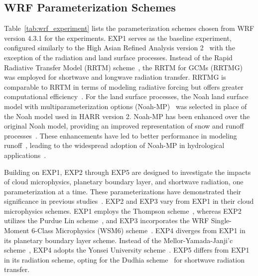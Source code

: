 \documentclass[draft]{agujournal2019}
\begin{document}
\subsection{WRF Parameterization Schemes}
\label{sec:wrf}

Table~\ref{tab:wrf_experiment} lists the parameterization schemes chosen from WRF version 4.3.1 for the experiments. EXP1 serves as the baseline experiment, configured similarly to the High Asian Refined Analysis version 2~\cite{wang2021IJC} with the exception of the radiation and land surface processes. Instead of the Rapid Radiative Transfer Model (RRTM) scheme~\cite{mlawer1997JGRA}, the RRTM for GCMs (RRTMG)~\cite{iacono2008JGRA} was employed for shortwave and longwave radiation transfer. RRTMG is comparable to RRTM in terms of modeling radiative forcing but offers greater computational efficiency~\cite{iacono2008JGRA}. For the land surface processes, the Noah land surface model with multiparameterization options (Noah-MP)~\cite{niu2011JGRA,yang2011JGRA} was selected in place of the Noah model used in HARR version 2. Noah-MP has been enhanced over the original Noah model, providing an improved representation of snow and runoff processes~\cite{niu2011JGRA}. These enhancements have led to better performance in modeling runoff~\cite{liang2019AAS, zheng2023ESSD}, leading to the widespread adoption of Noah-MP in hydrological applications~\cite{cosgrove2024JAWRA, lin2018JHM}.

Building on EXP1, EXP2 through EXP5 are designed to investigate the impacts of cloud microphysics, planetary boundary layer, and shortwave radiation, one parameterization at a time. These parameterizations have demonstrated their significance in previous studies~\cite{lv2020JGRA, prein2023CD}. EXP2 and EXP3 vary from EXP1 in their cloud microphysics schemes. EXP1 employs the Thompson scheme~\cite{thompson2008MWR}, whereas EXP2 utilizes the Purdue Lin scheme~\cite{chen2002JMSJ}, and EXP3 incorporates the WRF Single-Moment 6-Class Microphysics (WSM6) scheme~\cite{hong2006APJAS}. EXP4 diverges from EXP1 in its planetary boundary layer scheme. Instead of the Mellor-Yamada-Janji'c scheme~\cite{janjic1994MWR}, EXP4 adopts the Yonsei University scheme~\cite{hong2006MWR}. EXP5 differs from EXP1 in its radiation scheme, opting for the Dudhia scheme~\cite{dudhia1989JAS} for shortwave radiation transfer.
\end{document}
